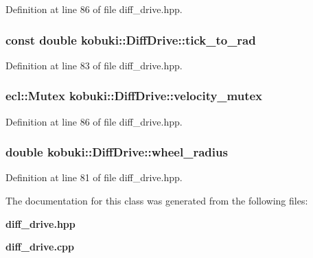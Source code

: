 \-Definition at line 86 of file diff\-\_\-drive.\-hpp.

\subsubsection[{tick\-\_\-to\-\_\-rad}]{\setlength{\rightskip}{0pt plus 5cm}const double {\bf kobuki\-::\-Diff\-Drive\-::tick\-\_\-to\-\_\-rad}\hspace{0.3cm}{\ttfamily  [private]}}\label{classkobuki_1_1DiffDrive_ac61d00b9dfa7e395e42e8440124c0d46}


\-Definition at line 83 of file diff\-\_\-drive.\-hpp.

\subsubsection[{velocity\-\_\-mutex}]{\setlength{\rightskip}{0pt plus 5cm}ecl\-::\-Mutex {\bf kobuki\-::\-Diff\-Drive\-::velocity\-\_\-mutex}\hspace{0.3cm}{\ttfamily  [private]}}\label{classkobuki_1_1DiffDrive_a7f9245868c140c829a98d5a94ffbeb3b}


\-Definition at line 86 of file diff\-\_\-drive.\-hpp.

\subsubsection[{wheel\-\_\-radius}]{\setlength{\rightskip}{0pt plus 5cm}double {\bf kobuki\-::\-Diff\-Drive\-::wheel\-\_\-radius}\hspace{0.3cm}{\ttfamily  [private]}}\label{classkobuki_1_1DiffDrive_a8074f33732a3dd52f6ba2fc00223727d}


\-Definition at line 81 of file diff\-\_\-drive.\-hpp.



\-The documentation for this class was generated from the following files\-:\begin{DoxyCompactItemize}
\item 
{\bf diff\-\_\-drive.\-hpp}\item 
{\bf diff\-\_\-drive.\-cpp}\end{DoxyCompactItemize}
